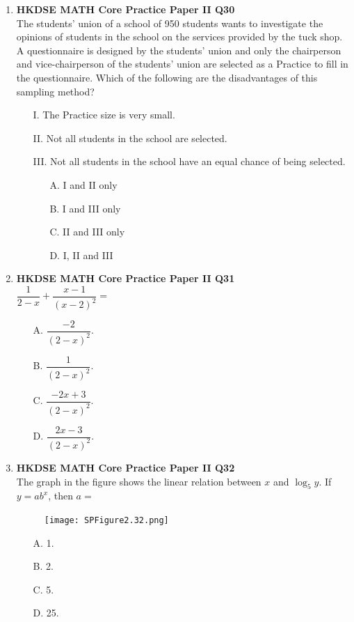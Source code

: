 \documentclass[12pt]{article}
\begin{document}
\begin{enumerate}
	\item \textbf{HKDSE MATH Core Practice Paper II Q30}\\
	The students' union of a school of 950 students wants to investigate the opinions of students in the school on the services provided by the tuck shop. A questionnaire is designed by the students' union and only the chairperson and vice-chairperson of the students' union are selected as a Practice to fill in the questionnaire. Which of the following are the disadvantages of this sampling method?
	\begin{enumerate}
		\item[I.] The Practice size is very small.
		\item[II.] Not all students in the school are selected.
		\item[III.] Not all students in the school have an equal chance of being selected.
		\item[]
		\begin{enumerate}
			\item[A.] I and II only
			\item[B.] I and III only
			\item[C.] II and III only
			\item[D.] I, II and III
		\end{enumerate}
	\end{enumerate}
	
	\item \textbf{HKDSE MATH Core Practice Paper II Q31}\\
	$\dfrac{1}{2 - x} + \dfrac{x - 1}{(x - 2)^2} = $
	\begin{enumerate}
		\item[A.] $\dfrac{-2}{(2 - x)^2}$.
		\item[B.] $\dfrac{1}{(2 - x)^2}$.
		\item[C.] $\dfrac{-2x + 3}{(2 - x)^2}$.
		\item[D.] $\dfrac{2x - 3}{(2 - x)^2}$.
	\end{enumerate}
	
	\item \textbf{HKDSE MATH Core Practice Paper II Q32}\\
	The graph in the figure shows the linear relation between $x$ and $\log_5{y}$. If $y = ab^x$, then $a =$
	\begin{figure}[H]
		\centering
		\texttt{[image: SPFigure2.32.png]}	
	\end{figure}
	\begin{enumerate}
		\item[A.] 1.
		\item[B.] 2.
		\item[C.] 5.
		\item[D.] 25.
	\end{enumerate}
	

\end{enumerate}
\end{document}
